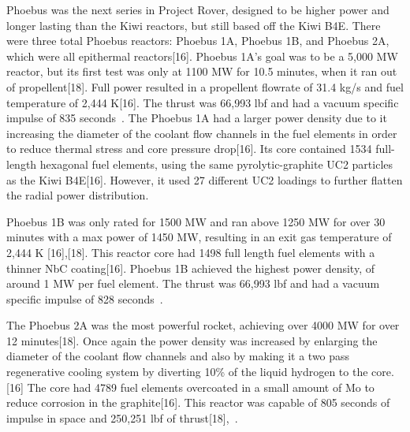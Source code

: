 \documentclass{article}
\begin{document}
    Phoebus was the next series in Project Rover, designed to be higher power and longer lasting than the Kiwi reactors, but still based off the Kiwi B4E. There were three total Phoebus reactors: Phoebus 1A, Phoebus 1B, and Phoebus 2A, which were all epithermal reactors[16]. Phoebus 1A's goal was to be a 5,000 MW reactor, but its first test was only at 1100 MW for 10.5 minutes, when it ran out of propellent[18]. Full power resulted in a propellent flowrate of 31.4 kg/s and fuel temperature of 2,444 K[16]. The thrust was 66,993 lbf and had a vacuum specific impulse of 835 seconds~\cite{presrovernerva}. The Phoebus 1A had a larger power density due to it increasing the diameter of the coolant flow channels in the fuel elements in order to reduce thermal stress and core pressure drop[16]. Its core contained 1534 full-length hexagonal fuel elements, using the same pyrolytic-graphite UC2 particles as the Kiwi B4E[16]. However, it used 27 different UC2 loadings to further flatten the radial power distribution.


    Phoebus 1B was only rated for 1500 MW and ran above 1250 MW for over 30 minutes with a max power of 1450 MW, resulting in an exit gas temperature of 2,444 K [16],[18]. This reactor core had 1498 full length fuel elements with a thinner NbC coating[16]. Phoebus 1B achieved the highest power density, of around 1 MW per fuel element. The thrust was 66,993 lbf and had a vacuum specific impulse of 828 seconds~\cite{presrovernerva}.


    The Phoebus 2A was the most powerful rocket, achieving over 4000 MW for over 12 minutes[18]. Once again the power density was increased by enlarging the diameter of the coolant flow channels and also by making it a two pass regenerative cooling system by diverting 10\% of the liquid hydrogen to the core.[16] The core had 4789 fuel elements overcoated in a small amount of Mo to reduce corrosion in the graphite[16]. This reactor was capable of 805 seconds of impulse in space and 250,251 lbf of thrust[18],~\cite{presrovernerva}. 
    
\end{document}

